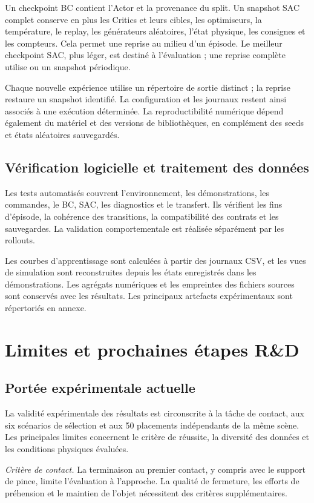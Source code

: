 \documentclass[conference,a4paper]{IEEEtran}
\newcommand{\code}[1]{\texttt{\detokenize{#1}}}
\begin{document}
Un checkpoint BC contient l'Actor et la provenance du split. Un snapshot SAC complet conserve en plus les Critics et leurs cibles, les optimiseurs, la température, le replay, les générateurs aléatoires, l'état physique, les consignes et les compteurs. Cela permet une reprise au milieu d'un épisode. Le meilleur checkpoint SAC, plus léger, est destiné à l'évaluation ; une reprise complète utilise \code{latest.pt} ou un snapshot périodique.

Chaque nouvelle expérience utilise un répertoire de sortie distinct ; la reprise restaure un snapshot identifié. La configuration et les journaux restent ainsi associés à une exécution déterminée. La reproductibilité numérique dépend également du matériel et des versions de bibliothèques, en complément des seeds et états aléatoires sauvegardés.

\subsection{Vérification logicielle et traitement des données}
Les tests automatisés couvrent l'environnement, les démonstrations, les commandes, le BC, SAC, les diagnostics et le transfert. Ils vérifient les fins d'épisode, la cohérence des transitions, la compatibilité des contrats et les sauvegardes. La validation comportementale est réalisée séparément par les rollouts.

Les courbes d'apprentissage sont calculées à partir des journaux CSV, et les vues de simulation sont reconstruites depuis les états enregistrés dans les démonstrations. Les agrégats numériques et les empreintes des fichiers sources sont conservés avec les résultats. Les principaux artefacts expérimentaux sont répertoriés en annexe.

\section{Limites et prochaines étapes R\&D}
\subsection{Portée expérimentale actuelle}
La validité expérimentale des résultats est circonscrite à la tâche de contact, aux six scénarios de sélection et aux 50 placements indépendants de la même scène. Les principales limites concernent le critère de réussite, la diversité des données et les conditions physiques évaluées.

\textit{Critère de contact.} La terminaison au premier contact, y compris avec le support de pince, limite l'évaluation à l'approche. La qualité de fermeture, les efforts de préhension et le maintien de l'objet nécessitent des critères supplémentaires.
\end{document}
